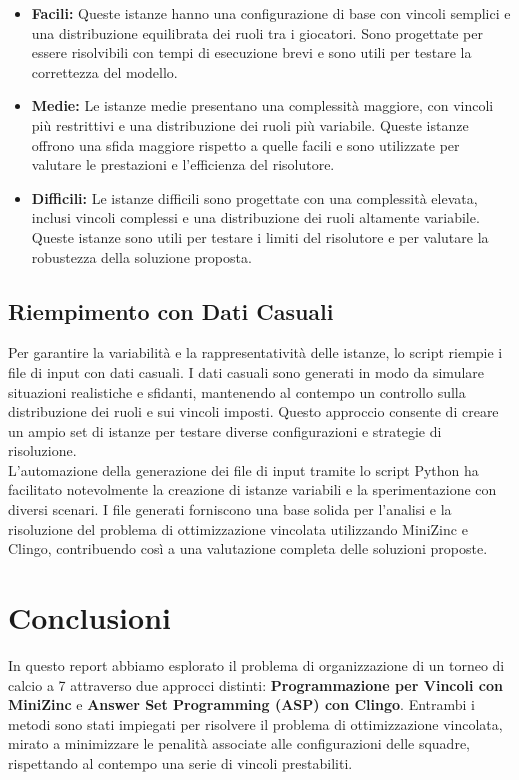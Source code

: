 \documentclass{article}
\begin{document}
\begin{multicols*}{2}
\begin{itemize}
    \item \textbf{Facili:} Queste istanze hanno una configurazione di base con vincoli semplici e una distribuzione equilibrata dei ruoli tra i giocatori. Sono progettate per essere risolvibili con tempi di esecuzione brevi e sono utili per testare la correttezza del modello.
    \item \textbf{Medie:} Le istanze medie presentano una complessità maggiore, con vincoli più restrittivi e una distribuzione dei ruoli più variabile. Queste istanze offrono una sfida maggiore rispetto a quelle facili e sono utilizzate per valutare le prestazioni e l'efficienza del risolutore.
    \item \textbf{Difficili:} Le istanze difficili sono progettate con una complessità elevata, inclusi vincoli complessi e una distribuzione dei ruoli altamente variabile. Queste istanze sono utili per testare i limiti del risolutore e per valutare la robustezza della soluzione proposta.
\end{itemize}

\subsection{Riempimento con Dati Casuali}

Per garantire la variabilità e la rappresentatività delle istanze, lo script riempie i file di input con dati casuali. I dati casuali sono generati in modo da simulare situazioni realistiche e sfidanti, mantenendo al contempo un controllo sulla distribuzione dei ruoli e sui vincoli imposti. Questo approccio consente di creare un ampio set di istanze per testare diverse configurazioni e strategie di risoluzione.
\\
L'automazione della generazione dei file di input tramite lo script Python ha facilitato notevolmente la creazione di istanze variabili e la sperimentazione con diversi scenari. I file generati forniscono una base solida per l'analisi e la risoluzione del problema di ottimizzazione vincolata utilizzando MiniZinc e Clingo, contribuendo così a una valutazione completa delle soluzioni proposte.

\clearpage

\section{Conclusioni}

In questo report abbiamo esplorato il problema di organizzazione di un torneo di calcio a 7 attraverso due approcci distinti: \textbf{Programmazione per Vincoli con MiniZinc} e \textbf{Answer Set Programming (ASP) con Clingo}. Entrambi i metodi sono stati impiegati per risolvere il problema di ottimizzazione vincolata, mirato a minimizzare le penalità associate alle configurazioni delle squadre, rispettando al contempo una serie di vincoli prestabiliti.


\end{multicols*}
\end{document}
